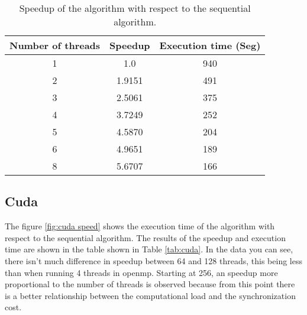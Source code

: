 \documentclass{IEEEtran}
\begin{document}

\begin{table}[h]
  \centering
  \begin{tabular}{|c|c|c|}
    \hline
    \textbf{Number of threads} & \textbf{Speedup} & \textbf{Execution time (Seg)} \\ \hline
    1                          & 1.0              & 940                           \\
    2                          & 1.9151           & 491                           \\
    3                          & 2.5061           & 375                           \\
    4                          & 3.7249           & 252                           \\
    5                          & 4.5870           & 204                           \\
    6                          & 4.9651           & 189                           \\
    8                          & 5.6707           & 166                           \\ \hline
  \end{tabular}
  \caption{Speedup of the algorithm with respect to the sequential algorithm.}
  \label{tab:openmp}
\end{table}




\subsection{Cuda}

The figure \ref{fig:cuda speed} shows the execution time of the algorithm with respect to the sequential algorithm. The results of the speedup and execution time are shown in the table shown in Table \ref{tab:cuda}. In the data you can see, there isn't much difference in speedup between 64 and 128 threads, this being less than when running 4 threads in openmp. Starting at 256, an speedup more proportional to the number of threads is observed because from this point there is a better relationship between the computational load and the synchronization cost.

\end{document}
